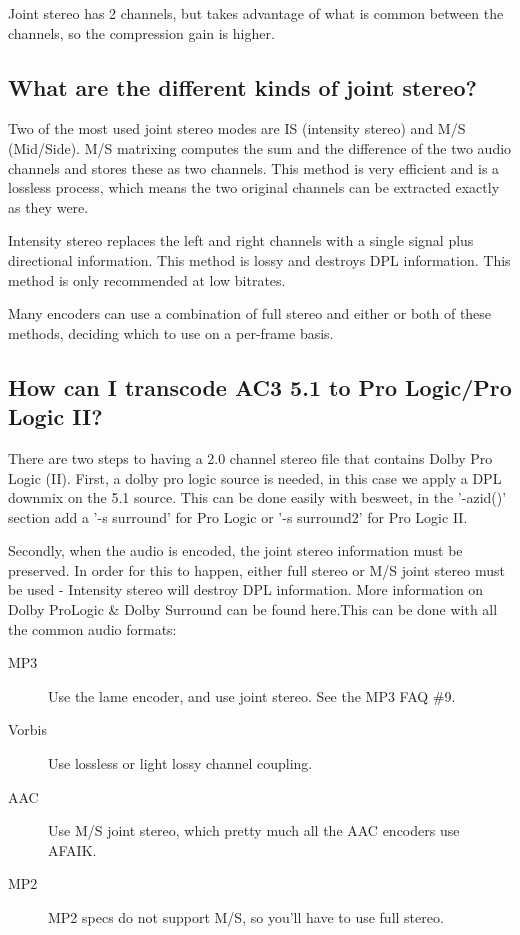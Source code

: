 ﻿\documentclass[12pt]{article}
\begin{document}
Joint stereo has 2 channels, but takes advantage of what is common between the channels, so the
compression gain is higher.

\subsection{What are the different kinds of joint stereo?}

Two of the most used joint stereo modes are IS (intensity stereo) and M/S (Mid/Side). M/S matrixing
computes the sum and the difference of the two audio channels and stores these as two channels. This
method is very efficient and is a lossless process, which means the two original channels can be
extracted exactly as they were.

Intensity stereo replaces the left and right channels with a single signal plus directional
information. This method is lossy and destroys DPL information. This method is only recommended at
low bitrates.

Many encoders can use a combination of full stereo and either or both of these methods, deciding
which to use on a per-frame basis.

\subsection{How can I transcode AC3 5.1 to Pro Logic/Pro Logic II?}

There are two steps to having a 2.0 channel stereo file that contains Dolby Pro Logic (II). First, a
dolby pro logic source is needed, in this case we apply a DPL downmix on the 5.1 source. This can be
done easily with besweet, in the '-azid()' section add a '-s surround' for Pro Logic or '-s
surround2' for Pro Logic II.

Secondly, when the audio is encoded, the joint stereo information must be preserved. In order for
this to happen, either full stereo or M/S joint stereo must be used - Intensity stereo will destroy
DPL information. More information on Dolby ProLogic \& Dolby Surround can be found here.This can be
done with all the common audio formats:
\begin{description}
  \item[MP3] Use the lame encoder, and use joint stereo. See the MP3 FAQ \#9.
  \item[Vorbis] Use lossless or light lossy channel coupling.
  \item[AAC] Use M/S joint stereo, which pretty much all the AAC encoders use AFAIK.
  \item[MP2] MP2 specs do not support M/S, so you'll have to use full stereo.
\end{description}
\end{document}
